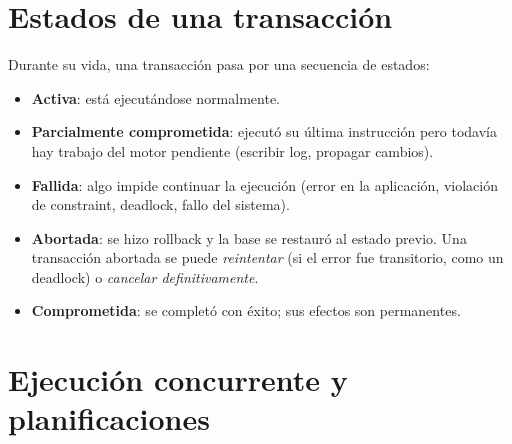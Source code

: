\documentclass[11pt,a4paper]{article}
\begin{document}
\section{Estados de una transacción}

Durante su vida, una transacción pasa por una secuencia de estados:

\begin{itemize}
    \item \textbf{Activa}: está ejecutándose normalmente.
    \item \textbf{Parcialmente comprometida}: ejecutó su última instrucción
    pero todavía hay trabajo del motor pendiente (escribir log, propagar
    cambios).
    \item \textbf{Fallida}: algo impide continuar la ejecución (error en
    la aplicación, violación de constraint, deadlock, fallo del sistema).
    \item \textbf{Abortada}: se hizo rollback y la base se restauró al
    estado previo. Una transacción abortada se puede \emph{reintentar}
    (si el error fue transitorio, como un deadlock) o \emph{cancelar
    definitivamente}.
    \item \textbf{Comprometida}: se completó con éxito; sus efectos son
    permanentes.
\end{itemize}

\begin{center}
\end{center}

\section{Ejecución concurrente y planificaciones}
\end{document}
